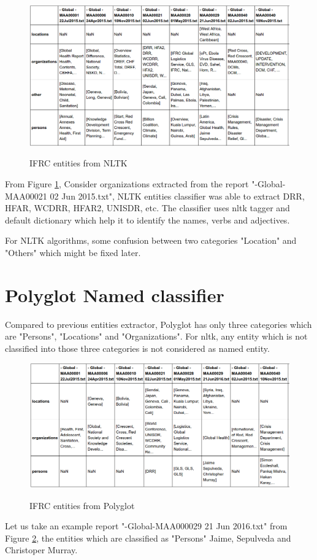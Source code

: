 \begin{figure}[hbtp]
\caption{IFRC entities from NLTK}
\centering
\includegraphics[scale=.45]{images/nltkalgo.png}\label{nltkalgo}
\end{figure}

From Figure \ref{nltkalgo}, Consider organizations extracted from the report "-Global-MAA00021 02 Jun 2015.txt", NLTK entities classifier was able to extract DRR, HFAR, WCDRR, HFAR2, UNISDR, etc. The classifier uses nltk tagger and default dictionary which help it to identify the names, verbs and adjectives.

For NLTK algorithms, some confusion between two categories "Location" and "Others" which might be fixed later.

\section{Polyglot Named classifier}

Compared to previous entities extractor, Polyglot has only three categories which are "Persons", "Locations" and "Organizations". For nltk, any entity which is not classified into those three categories is not considered as named entity.

\begin{figure}[hbtp]
\caption{IFRC entities from Polyglot}
\centering
\includegraphics[scale=.38]{images/polyglot.png}\label{polyglot}
\end{figure}
Let us take an example report "-Global-MAA000029 21 Jun 2016.txt" from Figure \ref{polyglot}, the entities which are classified as "Persons" Jaime, Sepulveda and  Christoper Murray.




